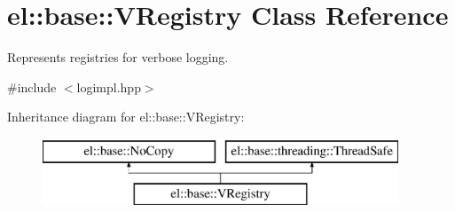 \hypertarget{classel_1_1base_1_1VRegistry}{\section{el\-:\-:base\-:\-:V\-Registry Class Reference}
\label{classel_1_1base_1_1VRegistry}
}


Represents registries for verbose logging.  




{\ttfamily \#include $<$logimpl.\-hpp$>$}

Inheritance diagram for el\-:\-:base\-:\-:V\-Registry\-:\begin{figure}[H]
\begin{center}
\leavevmode
\includegraphics[height=2.000000cm]{classel_1_1base_1_1VRegistry}
\end{center}
\end{figure}
